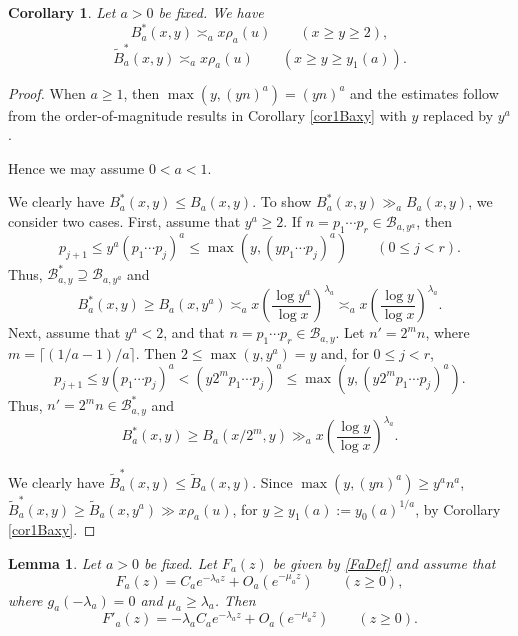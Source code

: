 \documentclass[11pt]{amsart}
\newtheorem{corollary}{Corollary}
\newtheorem{lemma}{Lemma}
\begin{document}
\begin{corollary}\label{corBaxy}
Let $a>0$ be fixed. We have
$$
B^*_{a} (x,y)  \asymp_a x  \rho_a(u)  \qquad (x\ge y\ge 2),
$$
$$
\tilde{B}^*_{a} (x,y)\asymp_a x  \rho_a(u)  \qquad (x\ge y\ge y_1(a)).
$$
\end{corollary}
\begin{proof}
When $a\ge 1$, then $\max(y, (yn)^{a}) = (yn)^a$ and the estimates follow from the order-of-magnitude results
in Corollary \ref{cor1Baxy}  with $y$ replaced by $y^a$.  

Hence we may assume $0<a<1$. 


We clearly have $B^*_{a}(x,y) \le B_{a}(x,y)$.
To show  $B^*_{a}(x,y)\gg_a B_{a}(x,y)$, we consider two cases. First, assume that $y^a \ge 2$.
If $n=p_1\cdots p_r \in \mathcal{B}_{a,y^{a}}$, then 
$$
p_{j+1} \le y^{a} (p_1\cdots p_j)^{a} \le \max(y,(y p_1 \cdots p_j)^{a}) \qquad (0\le j < r).
$$
Thus, $\mathcal{B}^*_{a,y} \supseteq \mathcal{B}_{a,y^{a}}$ and 
$$
B^*_{a}(x,y) \ge B_{a}(x,y^{a}) \asymp_a x \left(\frac{\log y^a }{\log x}\right)^{\lambda_a}
\asymp_a x \left(\frac{\log y }{\log x}\right)^{\lambda_a}.
$$
Next, assume that $y^a<2$, and that $n=p_1\cdots p_r \in \mathcal{B}_{a,y}$. Let $n'=2^m n$, where $m=\lceil (1/a-1)/a \rceil$. 
Then $2 \le \max(y, y^a)=y$ and, for $0\le j<r$,
$$
p_{j+1} \le y (p_1 \cdots p_j)^a < (y 2^m p_1 \cdots p_j)^a \le \max(y,  (y 2^m p_1 \cdots p_j)^a).
$$
Thus, $n'=2^m n \in \mathcal{B}^*_{a,y}$ and 
$$
B^*_a(x,y) \ge B_a(x/2^m,y) \gg_a x \left(\frac{\log y }{\log x}\right)^{\lambda_a}.
$$

We clearly have $\tilde{B}^*_{a}(x,y) \le \tilde{B}_{a}(x,y)$. Since  $\max(y, (yn)^{a}) \ge y^a n^a$, 
$\tilde{B}^*_{a}(x,y) \ge \tilde{B}_a(x,y^a) \gg x \rho_a(u)$, for $y\ge y_1(a):=y_0(a)^{1/a}$, by Corollary \ref{cor1Baxy}.

\end{proof}



\begin{lemma}\label{lemhypeq}
Let $a>0$ be fixed.
Let $F_a(z)$ be given by \eqref{FaDef} and assume that 
\begin{equation}\label{hypeq1}
 F_a(z) =C_a e^{-\lambda_a z} + O_a(e^{-\mu_a z}) \qquad (z\ge 0),
\end{equation}
where $g_a(-\lambda_a) =0$ and $\mu_a \ge \lambda_a$. Then
\begin{equation}\label{hypeq2}
F'_a(z) = -\lambda_a C_a e^{-\lambda_a z} + O_a(e^{-\mu_a z}) \qquad (z\ge 0).
\end{equation}
\end{lemma}
\end{document}
